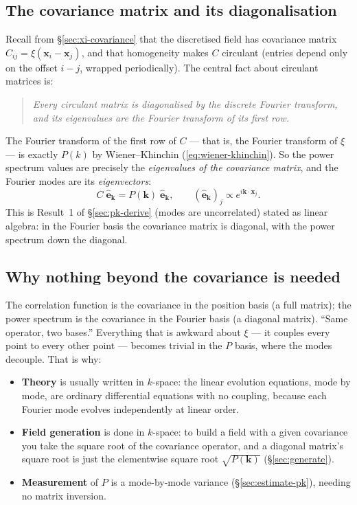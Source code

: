 \documentclass[12pt]{article}
\newcommand{\bk}{\mathbf{k}}
\newcommand{\bx}{\mathbf{x}}
\begin{document}
\subsection{The covariance matrix and its diagonalisation}
\label{sec:cov-diag}

Recall from \S\ref{sec:xi-covariance} that the discretised field has
covariance matrix $C_{ij} = \xi(\bx_i - \bx_j)$, and that homogeneity
makes $C$ circulant (entries depend only on the offset $i - j$, wrapped
periodically).  The central fact about circulant matrices is:

\begin{quote}
\emph{Every circulant matrix is diagonalised by the discrete Fourier
transform, and its eigenvalues are the Fourier transform of its first
row.}
\end{quote}

The Fourier transform of the first row of $C$ --- that is, the Fourier
transform of $\xi$ --- is exactly $P(k)$ by Wiener--Khinchin
(\ref{eq:wiener-khinchin}).  So the power spectrum values are precisely
the \emph{eigenvalues of the covariance matrix}, and the Fourier modes
are its \emph{eigenvectors}:
\begin{equation}
  C\;\hat{\mathbf e}_\bk = P(\bk)\;\hat{\mathbf e}_\bk,
  \qquad
  (\hat{\mathbf e}_\bk)_j \propto e^{i\bk\cdot\bx_j}.
\end{equation}
This is Result~1 of \S\ref{sec:pk-derive} (modes are uncorrelated) stated
as linear algebra: in the Fourier basis the covariance matrix is
diagonal, with the power spectrum down the diagonal.

\subsection{Why nothing beyond the covariance is needed}

The correlation function is the covariance in the position basis (a full
matrix); the power spectrum is the covariance in the Fourier basis (a
diagonal matrix).  ``Same operator, two bases.''  Everything that is
awkward about $\xi$ --- it couples every point to every other point ---
becomes trivial in the $P$ basis, where the modes decouple.  That is why:

\begin{itemize}
  \item \textbf{Theory} is usually written in $k$-space: the linear
        evolution equations, mode by mode, are ordinary differential
        equations with no coupling, because each Fourier mode evolves
        independently at linear order.
  \item \textbf{Field generation} is done in $k$-space: to build a field
        with a given covariance you take the square root of the
        covariance operator, and a diagonal matrix's square root is just
        the elementwise square root $\sqrt{P(\bk)}$
        (\S\ref{sec:generate}).
  \item \textbf{Measurement} of $P$ is a mode-by-mode variance
        (\S\ref{sec:estimate-pk}), needing no matrix inversion.
\end{itemize}
\end{document}
